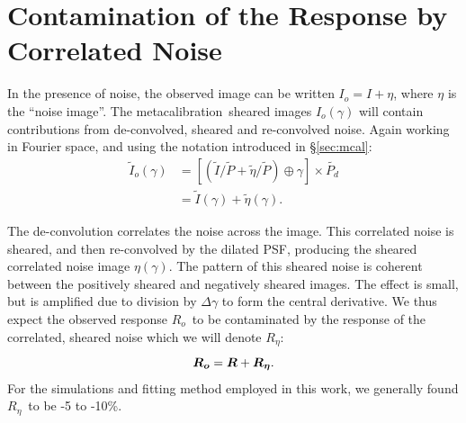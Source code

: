 \documentclass[iop]{emulateapj}
\newcommand{\mcal}{metacalibration}
\newcommand{\mcalR}{\mbox{\boldmath $R$}}
\newcommand{\mcalRo}{\mbox{\boldmath $R_o$}}
\newcommand{\mcalRnoise}{\mbox{\boldmath $R_\eta$}}
\newcommand{\Itild}{\mbox{$\widetilde{I}$}}
\newcommand{\ntil}{\mbox{$\widetilde{\eta}$}}
\newcommand{\Ptil}{\mbox{$\widetilde{P}$}}
\newcommand{\Ptild}{\mbox{$\widetilde{P_d}$}}
\newcommand{\SSs}{$\left<R_{S}R_{S}\right>$}
\begin{document}

\section{Contamination of the Response by Correlated Noise} \label{sec:contam}

In the presence of noise, the observed image can be written $I_o=I+\eta$, where $\eta$
is the ``noise image''.  The \mcal\ sheared images $I_o(\gamma)$ will contain
contributions from de-convolved, sheared and re-convolved noise. Again working
in Fourier space, and using the notation introduced in \S \ref{sec:mcal}:
\begin{align}
    \Itild_o(\gamma) &= \left[ \left( \Itild/\Ptil + \ntil/\Ptil \right) \oplus \gamma \right] \times \Ptild  \nonumber \\
    &= \Itild(\gamma) + \ntil(\gamma).
\end{align}

The de-convolution correlates the noise across the image.  This correlated
noise is sheared, and then re-convolved by the dilated PSF, producing the
sheared correlated noise image $\eta(\gamma)$.  The pattern of this sheared
noise is coherent between the positively sheared and negatively sheared images.
The effect is small, but is amplified due to division by $\Delta \gamma$ to
form the central derivative.  We thus expect the observed response \mcalRo\ to
be contaminated by the response of the correlated, sheared noise which
we will denote \mcalRnoise:
\begin{equation}
    \mbox{\mcalRo}  =  \mcalR + \mbox{\mcalRnoise}.
\end{equation}
For the simulations and fitting method employed in this work, we generally
found \mcalRnoise\ to be -5 to -10\%.
\end{document}
